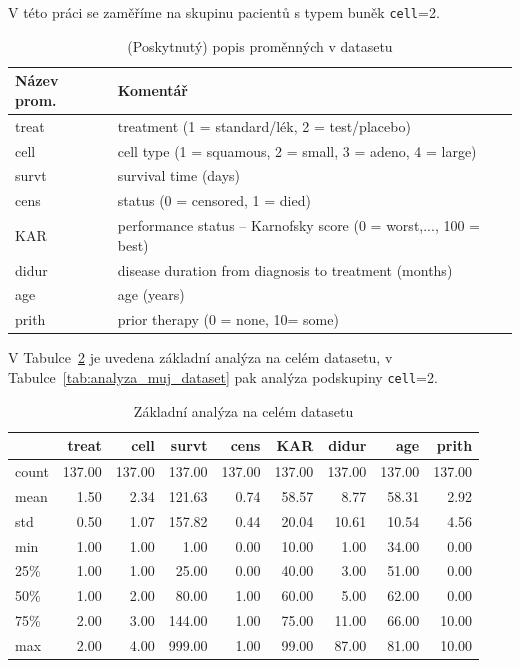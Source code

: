 \documentclass[a4, 11pt]{article}
\theoremstyle{definition}
\theoremstyle{remark}
\begin{document}
	V této práci se zaměříme na skupinu pacientů s typem buněk \texttt{cell}=2. 
	
\begin{table}[H]
	\centering
	\begin{tabular}{@{}ll@{}}
		\toprule
		Název prom. & Komentář                    \\ 
		\midrule
		treat & treatment (1 = standard/lék, 2 = test/placebo)                    \\
		cell  & cell type (1 = squamous, 2 = small, 3 = adeno, 4 = large)         \\
		survt & survival time   (days)                                          \\
		cens  & status (0 = censored, 1 = died)                                 \\
		KAR   & performance status -- Karnofsky score (0 = worst,..., 100 = best) \\
		didur & disease duration from diagnosis to treatment (months)           \\
		age   & age (years)                                                     \\
		prith & prior therapy (0 = none, 10= some)                             \\
		\bottomrule
	\end{tabular}
	\caption{(Poskytnutý) popis proměnných v datasetu}
	\label{tab:promenne_popis}
\end{table}

V Tabulce~\ref{tab:zaklad_anal_cely_dataset} je uvedena základní analýza na celém datasetu, v Tabulce~\ref{tab:analyza_muj_dataset} pak analýza podskupiny \texttt{cell}=2.

\begin{table}[H]
	\centering
	\begin{tabular}{lrrrrrrrr}
		\toprule
		& treat & cell & survt & cens & KAR & didur & age & prith \\
		\midrule
		count & 137.00 & 137.00 & 137.00 & 137.00 & 137.00 & 137.00 & 137.00 & 137.00 \\
		mean & 1.50 & 2.34 & 121.63 & 0.74 & 58.57 & 8.77 & 58.31 & 2.92 \\
		std & 0.50 & 1.07 & 157.82 & 0.44 & 20.04 & 10.61 & 10.54 & 4.56 \\
		min & 1.00 & 1.00 & 1.00 & 0.00 & 10.00 & 1.00 & 34.00 & 0.00 \\
		25\% & 1.00 & 1.00 & 25.00 & 0.00 & 40.00 & 3.00 & 51.00 & 0.00 \\
		50\% & 1.00 & 2.00 & 80.00 & 1.00 & 60.00 & 5.00 & 62.00 & 0.00 \\
		75\% & 2.00 & 3.00 & 144.00 & 1.00 & 75.00 & 11.00 & 66.00 & 10.00 \\
		max & 2.00 & 4.00 & 999.00 & 1.00 & 99.00 & 87.00 & 81.00 & 10.00 \\
		\bottomrule
	\end{tabular}
	\caption{Základní analýza na celém datasetu} \label{tab:zaklad_anal_cely_dataset}
\end{table}
\end{document}
